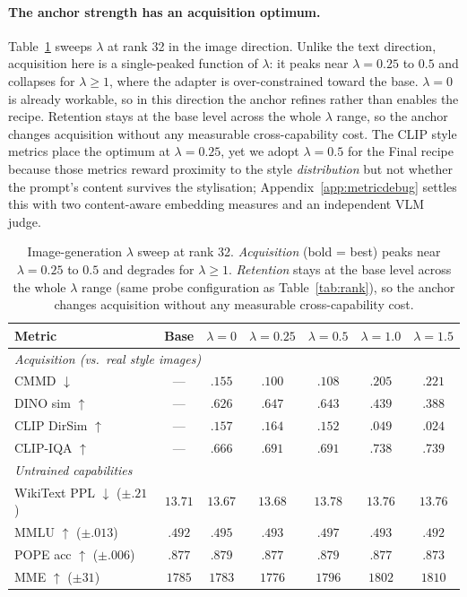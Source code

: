 \documentclass{article}
\begin{document}
\paragraph{The anchor strength has an acquisition optimum.}
Table~\ref{tab:klimg} sweeps $\lambda$ at rank 32 in the image direction. Unlike
the text direction, acquisition here is a single-peaked function of $\lambda$: it
peaks near $\lambda{=}0.25$ to $0.5$ and collapses for $\lambda\!\geq\!1$, where
the adapter is over-constrained toward the base. $\lambda{=}0$ is already
workable, so in this direction the anchor refines rather than enables the recipe.
Retention stays at the base level across the whole $\lambda$ range, so the anchor
changes acquisition without any measurable cross-capability cost. The CLIP style
metrics place the optimum at $\lambda{=}0.25$, yet we adopt $\lambda{=}0.5$ for
the Final recipe because those metrics reward proximity to the style
\emph{distribution} but not whether the prompt's content survives the
stylisation; Appendix~\ref{app:metricdebug} settles this with two content-aware
embedding measures and an independent VLM judge.

\begin{table}[t]
\centering\small
\setlength{\tabcolsep}{6pt}
\begin{tabular}{lcccccc}
\toprule
Metric & Base & $\lambda{=}0$ & $\lambda{=}0.25$ & $\lambda{=}0.5$ & $\lambda{=}1.0$ & $\lambda{=}1.5$ \\
\midrule
\multicolumn{7}{l}{\textit{Acquisition (vs.\ real style images)}}\\
CMMD $\downarrow$      & --- & $.155$ & $\mathbf{.100}$ & $.108$ & $.205$ & $.221$ \\
DINO sim $\uparrow$    & --- & $.626$ & $\mathbf{.647}$ & $.643$ & $.439$ & $.388$ \\
CLIP DirSim $\uparrow$ & --- & $.157$ & $\mathbf{.164}$ & $.152$ & $.049$ & $.024$ \\
CLIP-IQA $\uparrow$    & --- & $.666$ & $.691$ & $.691$ & $.738$ & $\mathbf{.739}$ \\
\midrule
\multicolumn{7}{l}{\textit{Untrained capabilities}}\\
WikiText PPL $\downarrow$ \tiny($\pm.21$) & $13.71$ & $13.67$ & $13.68$ & $13.78$ & $13.76$ & $13.76$ \\
MMLU $\uparrow$ \tiny($\pm.013$)          & $.492$ & $.495$ & $.493$ & $.497$ & $.493$ & $.492$ \\
POPE acc $\uparrow$ \tiny($\pm.006$)      & $.877$ & $.879$ & $.877$ & $.879$ & $.877$ & $.873$ \\
MME $\uparrow$ \tiny($\pm31$)             & $1785$ & $1783$ & $1776$ & $1796$ & $1802$ & $1810$ \\
\bottomrule
\end{tabular}
\caption{Image-generation $\lambda$ sweep at rank 32. \textit{Acquisition} (bold
= best) peaks near $\lambda{=}0.25$ to $0.5$ and degrades for
$\lambda\!\geq\!1$. \textit{Retention} stays at the base level across the whole
$\lambda$ range (same probe configuration as Table~\ref{tab:rank}), so the anchor
changes acquisition without any measurable cross-capability cost.}
\label{tab:klimg}
\end{table}
\end{document}
